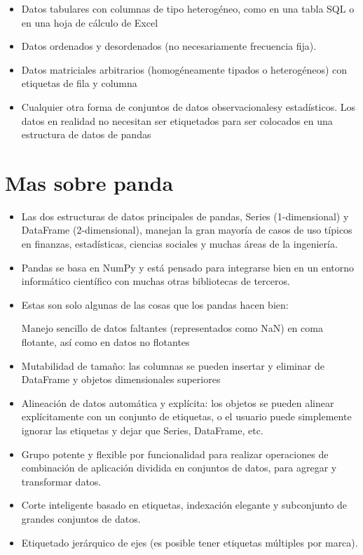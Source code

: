 \documentclass{article}
\begin{document}
\begin{itemize}

\item
Datos tabulares con columnas de tipo heterogéneo, como en una tabla SQL o en una hoja de cálculo de Excel
\item
Datos ordenados y desordenados (no necesariamente frecuencia fija).

\item
Datos matriciales arbitrarios (homogéneamente tipados o heterogéneos) con etiquetas de fila y columna

\item
Cualquier otra forma de conjuntos de datos observacionalesy estadísticos. Los datos en realidad no necesitan ser etiquetados para ser colocados en una estructura de datos de pandas

\end{itemize}

\section{Mas sobre panda}
\begin{itemize}
\item
Las dos estructuras de datos principales de pandas, Series (1-dimensional) y DataFrame (2-dimensional), manejan la gran mayoría de casos de uso típicos en finanzas, estadísticas, ciencias sociales y muchas áreas de la ingeniería.
\item
Pandas se basa en NumPy y está pensado para integrarse bien en un entorno informático científico con muchas otras bibliotecas de terceros.

\item
Estas son solo algunas de las cosas que los pandas hacen bien:


Manejo sencillo de datos faltantes (representados como NaN) en coma flotante, así como en datos no flotantes

\item
Mutabilidad de tamaño: las columnas se pueden insertar y eliminar de DataFrame y objetos dimensionales superiores
\item
Alineación de datos automática y explícita: los objetos se pueden alinear explícitamente con un conjunto de etiquetas, o el usuario puede simplemente ignorar las etiquetas y dejar que Series, DataFrame, etc.

\item
Grupo potente y flexible por funcionalidad para realizar operaciones de combinación de aplicación dividida en conjuntos de datos, para agregar y transformar datos.

\item
Corte inteligente basado en etiquetas, indexación elegante y subconjunto de grandes conjuntos de datos.

\item
Etiquetado jerárquico de ejes (es posible tener etiquetas múltiples por marca).

\end{itemize}
\end{document}
